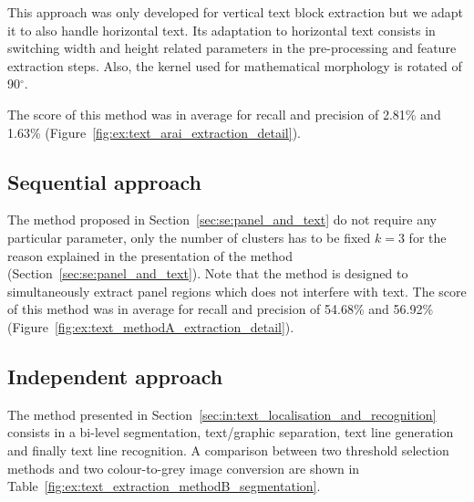 This approach was only developed for vertical text block extraction but we adapt it to also handle horizontal text.
Its adaptation to horizontal text consists in switching width and height related parameters in the pre-processing and feature extraction steps.
Also, the kernel used for mathematical morphology is rotated of 90$^{\circ}$.

The score of this method was in average for recall and precision of 2.81\% and 1.63\% (Figure~\ref{fig:ex:text_arai_extraction_detail}).

\subsection{Sequential approach} %
The method proposed in Section~\ref{sec:se:panel_and_text} do not require any particular parameter, only the number of clusters has to be fixed $k=3$ for the reason explained in the presentation of the method (Section~\ref{sec:se:panel_and_text}).
Note that the method is designed to simultaneously extract panel regions which does not interfere with text.
The score of this method was in average for recall and precision of 54.68\% and 56.92\% (Figure~\ref{fig:ex:text_methodA_extraction_detail}).



\subsection{Independent approach} %
\label{sub:ex:text_extraction_evaluation_method_b}

The method presented in Section~\ref{sec:in:text_localisation_and_recognition} consists in a bi-level segmentation, text/graphic separation, text line generation and finally text line recognition.
A comparison between two threshold selection methods and two colour-to-grey image conversion are shown in Table~\ref{fig:ex:text_extraction_methodB_segmentation}.


